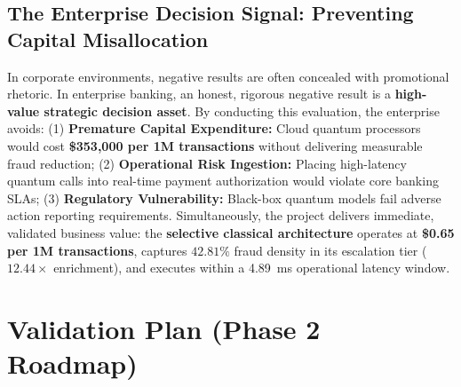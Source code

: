 \documentclass[10pt,a4paper]{article}
\begin{document}
\subsection{The Enterprise Decision Signal: Preventing Capital Misallocation}
In corporate environments, negative results are often concealed with promotional rhetoric. In enterprise banking, an honest, rigorous negative result is a \textbf{high-value strategic decision asset}. By conducting this evaluation, the enterprise avoids: (1) \textbf{Premature Capital Expenditure:} Cloud quantum processors would cost \textbf{\$353,000 per 1M transactions} without delivering measurable fraud reduction; (2) \textbf{Operational Risk Ingestion:} Placing high-latency quantum calls into real-time payment authorization would violate core banking SLAs; (3) \textbf{Regulatory Vulnerability:} Black-box quantum models fail adverse action reporting requirements. Simultaneously, the project delivers immediate, validated business value: the \textbf{selective classical architecture} operates at \textbf{\$0.65 per 1M transactions}, captures $42.81\%$ fraud density in its escalation tier ($12.44\times$ enrichment), and executes within a 4.89~ms operational latency window.

\clearpage


\section{Validation Plan (Phase 2 Roadmap)}
\end{document}
